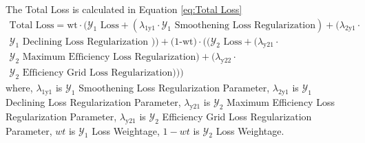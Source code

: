 \documentclass{report} %
\begin{document}
The Total Loss is calculated in Equation \ref{eq:Total Loss}
\begin{equation}
    \begin{split}
\text{Total Loss} = \text{wt} \cdot (\text{$\mathcal{Y}_1$ Loss} + (\lambda_{\text{1y1}} \cdot \text{$\mathcal{Y}_1$ Smoothening Loss Regularization}) +  (\lambda_{\text{2y1}} \cdot \\
\text{$\mathcal{Y}_1$ Declining Loss Regularization })) + \text{(1-wt)} \cdot ((\text{$\mathcal{Y}_2$ Loss} + (\lambda_{\text{y21}} \cdot \\ 
\text{$\mathcal{Y}_2$ Maximum Efficiency Loss Regularization}) + (\lambda_{\text{y22}} \cdot \\
\text{$\mathcal{Y}_2$ Efficiency Grid Loss Regularization})))
    \end{split}
    \label{eq:Total Loss}
\end{equation}
where, \(\lambda_{\text{1y1}}\) is $\mathcal{Y}_1$ Smoothening Loss Regularization Parameter, \(\lambda_{\text{2y1}}\) is $\mathcal{Y}_1$ Declining Loss Regularization Parameter,
        \(\lambda_{\text{y21}}\) is $\mathcal{Y}_2$ Maximum Efficiency Loss Regularization Parameter, \(\lambda_{\text{y21}}\) is $\mathcal{Y}_2$ Efficiency Grid Loss Regularization Parameter, 
        \(wt\) is $\mathcal{Y}_1$ Loss Weightage, \(1-wt\) is $\mathcal{Y}_2$ Loss Weightage. \\
\end{document}
